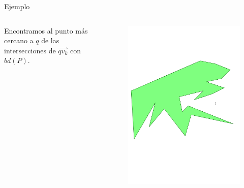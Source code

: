 \documentclass[aspectratio=169,xcolor=dvipsnames, t]{beamer}
\begin{document}
\begin{frame}{Ejemplo}
  \begin{columns}
    \begin{column}{0.3\textwidth}
      \raggedright %
      Encontramos al punto más cercano a $q$ de las intersecciones de $\overrightarrow{qv_{k}}$ con $bd(P)$.
    \end{column}
    \begin{column}{0.7\textwidth}
      \vspace{-1.5cm} %
      \begin{figure}
        \centering
        \includegraphics[width=1\linewidth, height=.85\textheight, page=4, keepaspectratio]{IPE/point_visibility.pdf}
      \end{figure}
    \end{column}
  \end{columns}
\end{frame}
\end{document}
